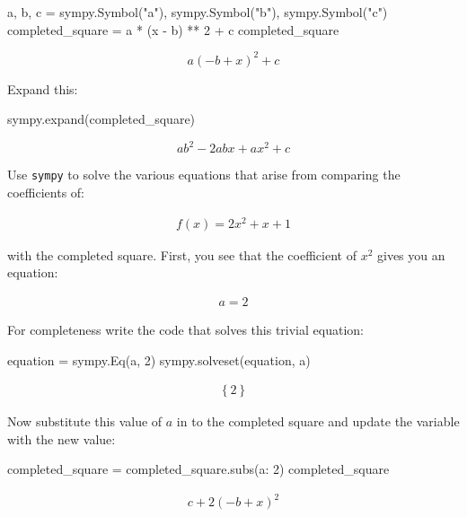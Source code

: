 \begin{pyin}
a, b, c = sympy.Symbol("a"), sympy.Symbol("b"), sympy.Symbol("c")
completed_square = a * (x - b) ** 2 + c
completed_square
\end{pyin}

\[a \left(- b + x\right)^{2} + c\]

Expand this:

\begin{pyin}
sympy.expand(completed_square)
\end{pyin}

\[a b^{2} - 2 a b x + a x^{2} + c\]

Use \texttt{sympy} to solve the various equations that arise from comparing
the coefficients of:

\begin{equation*}
\begin{split}
    f(x) = 2x ^2 + x + 1
\end{split}
\end{equation*}

with the completed square.
First, you see that the coefficient of \(x ^ 2\) gives you an equation:

\begin{equation*}
\begin{split}
    a = 2
\end{split}
\end{equation*}

For completeness write the code that solves this trivial equation:

\begin{pyin}
equation = sympy.Eq(a, 2)
sympy.solveset(equation, a)
\end{pyin}

\begin{equation*}
\begin{split}\displaystyle \left\{2\right\}\end{split}
\end{equation*}

Now substitute this value of \(a\) in to the completed square and update the variable with the new value:

\begin{pyin}
completed_square = completed_square.subs({a: 2})
completed_square
\end{pyin}

\begin{equation*}
\begin{split}\displaystyle c + 2 \left(- b + x\right)^{2}\end{split}
\end{equation*}

